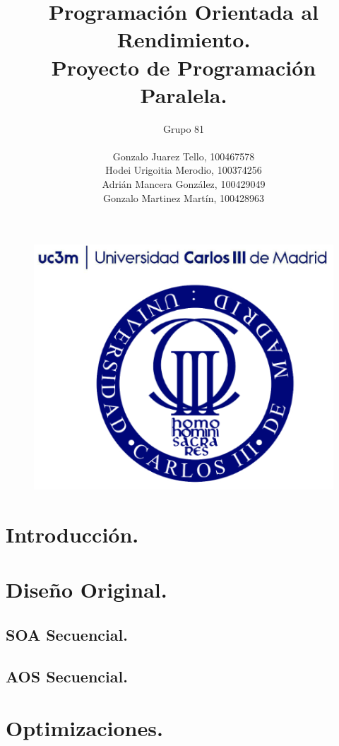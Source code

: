 \documentclass{article}
\title{Programación Orientada al Rendimiento.\\Proyecto de Programación Paralela.}
\author{Grupo 81\\ \\
	Gonzalo Juarez Tello, 100467578\\
	Hodei Urigoitia Merodio, 100374256\\
	Adrián Mancera González, 100429049\\
	Gonzalo Martinez Martín, 100428963
}
\date{}
\begin{document}
\begin{figure}
	\includegraphics[width=\linewidth,height=0.7\textwidth]{resources/logo_uc3m.png}
\end{figure}
\maketitle
\newpage

\tableofcontents
\newpage

\section{Introducción.\label{intro}}

\section{Diseño Original.\label{original}}
\subsection{SOA Secuencial.}
\subsection{AOS Secuencial.}

\section{Optimizaciones.\label{opt}}
\end{document}
